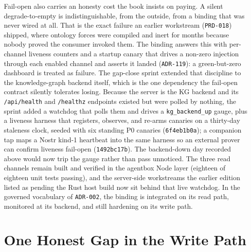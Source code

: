 Fail-open also carries an honesty cost the book insists on paying. A silent
degrade-to-empty is indistinguishable, from the outside, from a binding that was never
wired at all. That is the exact failure an earlier workstream (\texttt{PRD-018}) shipped,
where ontology forces were compiled and inert for months because nobody proved the consumer
invoked them. The binding answers this with per-channel liveness counters and a startup
canary that drives a non-zero injection through each enabled channel and asserts it landed
(\texttt{ADR-119}): a green-but-zero dashboard is treated as failure. The gap-close sprint
extended that discipline to the knowledge-graph backend itself, which is the one dependency
the fail-open contract silently tolerates losing. Because the server is the KG backend and
its \texttt{/api/health} and \texttt{/healthz} endpoints existed but were polled by nothing,
the sprint added a watchdog that polls them and drives a \texttt{kg\_backend\_up} gauge, plus
a liveness harness that registers, observes, and re-arms canaries on a thirty-day staleness
clock, seeded with six standing P0 canaries (\texttt{6f4eb1b0a}); a companion tap maps a Nostr
kind-1 heartbeat into the same harness so an external prover can confirm liveness fail-open
(\texttt{1492bc17b}). The backend-down day recorded above would now trip the gauge rather than
pass unnoticed. The three read channels remain built and verified in the agentbox Node layer
(eighteen of eighteen unit tests passing), and the server-side workstreams the earlier edition
listed as pending the Rust host build now sit behind that live watchdog. In the governed
vocabulary of \texttt{ADR-002}, the binding is integrated on its read path, monitored at its
backend, and still hardening on its write path.

\section{One Honest Gap in the Write Path}

